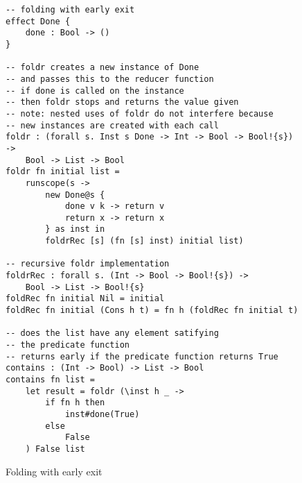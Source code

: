 \begin{figure}[h]
\caption{Folding with early exit}
\begin{verbatim}
-- folding with early exit
effect Done {
	done : Bool -> ()
}

-- foldr creates a new instance of Done
-- and passes this to the reducer function
-- if done is called on the instance
-- then foldr stops and returns the value given
-- note: nested uses of foldr do not interfere because
-- new instances are created with each call
foldr : (forall s. Inst s Done -> Int -> Bool -> Bool!{s}) ->
	Bool -> List -> Bool
foldr fn initial list =
	runscope(s ->
		new Done@s {
			done v k -> return v
			return x -> return x
		} as inst in
		foldrRec [s] (fn [s] inst) initial list)

-- recursive foldr implementation
foldrRec : forall s. (Int -> Bool -> Bool!{s}) ->
	Bool -> List -> Bool!{s}
foldRec fn initial Nil = initial
foldRec fn initial (Cons h t) = fn h (foldRec fn initial t)

-- does the list have any element satifying
-- the predicate function
-- returns early if the predicate function returns True
contains : (Int -> Bool) -> List -> Bool
contains fn list =
	let result = foldr (\inst h _ ->
		if fn h then
			inst#done(True)
		else
			False
	) False list
\end{verbatim}
\label{fig:localeffects}
\end{figure}
\fi
